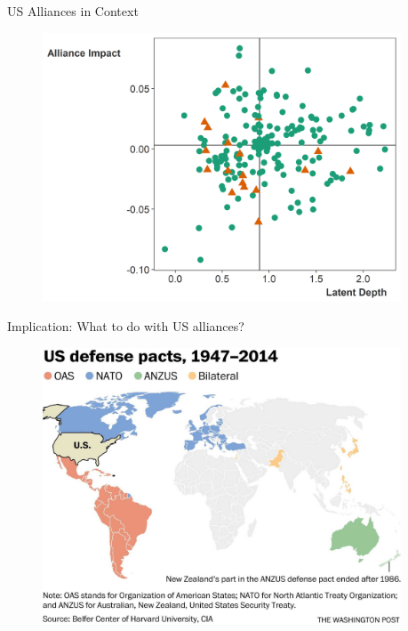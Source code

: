 \documentclass[12pt]{beamer}
\begin{document}
 

\begin{frame}{US Alliances in Context} 

\begin{figure}
	\centering
		\includegraphics[width=0.95\textwidth]{lambda-depth-us.png}
\end{figure}


 \end{frame}




\begin{frame}{Implication: What to do with US alliances?}

\begin{figure}[htbp]
	\centering
		\includegraphics[width=0.95\textwidth]{nato-map.jpg}
\end{figure}


\end{frame}
\end{document}
